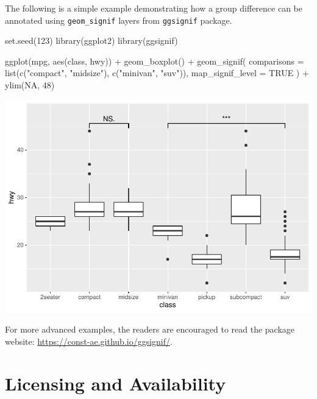 \documentclass{article}
\newenvironment{Shaded}{\begin{snugshade}}{\end{snugshade}}
\newcommand{\AttributeTok}[1]{\textcolor[rgb]{0.77,0.63,0.00}{#1}}
\newcommand{\ConstantTok}[1]{\textcolor[rgb]{0.00,0.00,0.00}{#1}}
\newcommand{\DecValTok}[1]{\textcolor[rgb]{0.00,0.00,0.81}{#1}}
\newcommand{\FunctionTok}[1]{\textcolor[rgb]{0.00,0.00,0.00}{#1}}
\newcommand{\NormalTok}[1]{#1}
\newcommand{\SpecialCharTok}[1]{\textcolor[rgb]{0.00,0.00,0.00}{#1}}
\newcommand{\StringTok}[1]{\textcolor[rgb]{0.31,0.60,0.02}{#1}}
\begin{document}
The following is a simple example demonstrating how a group difference
can be annotated using \texttt{geom\_signif} layers from
\texttt{ggsignif} package.

\begin{Shaded}
\begin{Highlighting}[]
\FunctionTok{set.seed}\NormalTok{(}\DecValTok{123}\NormalTok{)}
\FunctionTok{library}\NormalTok{(ggplot2)}
\FunctionTok{library}\NormalTok{(ggsignif)}

\FunctionTok{ggplot}\NormalTok{(mpg, }\FunctionTok{aes}\NormalTok{(class, hwy)) }\SpecialCharTok{+}
  \FunctionTok{geom\_boxplot}\NormalTok{() }\SpecialCharTok{+}
  \FunctionTok{geom\_signif}\NormalTok{(}
    \AttributeTok{comparisons =} \FunctionTok{list}\NormalTok{(}\FunctionTok{c}\NormalTok{(}\StringTok{"compact"}\NormalTok{, }\StringTok{"midsize"}\NormalTok{), }\FunctionTok{c}\NormalTok{(}\StringTok{"minivan"}\NormalTok{, }\StringTok{"suv"}\NormalTok{)),}
    \AttributeTok{map\_signif\_level =} \ConstantTok{TRUE}
\NormalTok{  ) }\SpecialCharTok{+}
  \FunctionTok{ylim}\NormalTok{(}\ConstantTok{NA}\NormalTok{, }\DecValTok{48}\NormalTok{)}
\end{Highlighting}
\end{Shaded}

\includegraphics[width=1\linewidth]{paper_files/figure-latex/simpe_comparison-1}

For more advanced examples, the readers are encouraged to read the
package website: \url{https://const-ae.github.io/ggsignif/}.

\hypertarget{licensing-and-availability}{%
\section{Licensing and Availability}\label{licensing-and-availability}}
\end{document}
